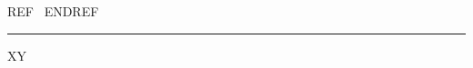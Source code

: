 \documentclass{article}
\newlength\reflen
\begin{document}
\setlength{}REF \the{}\ ENDREF
\par\rule{}{2pt}
\par XY
\end{document}
